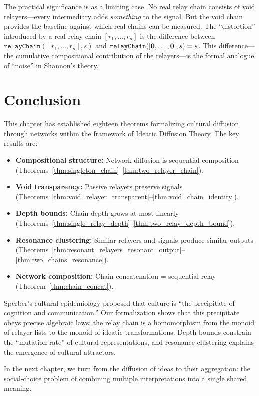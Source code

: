 The practical significance is as a limiting case.  No real relay chain
consists of void relayers---every intermediary adds \emph{something} to
the signal.  But the void chain provides the baseline against which
real chains can be measured.  The ``distortion'' introduced by a real
relay chain $[r_1, \ldots, r_n]$ is the difference between
$\texttt{relayChain}([r_1, \ldots, r_n], s)$ and
$\texttt{relayChain}([\mathbf{0}, \ldots, \mathbf{0}], s) = s$.  This
difference---the cumulative compositional contribution of the
relayers---is the formal analogue of ``noise'' in Shannon's theory.

\section{Conclusion}
\label{sec:ch18-concl}

This chapter has established eighteen theorems formalizing cultural
diffusion through networks within the framework of Ideatic Diffusion Theory.
The key results are:

\begin{itemize}
  \item \textbf{Compositional structure:} Network diffusion is sequential
    composition (Theorems~\ref{thm:singleton_chain}--\ref{thm:two_relayer_chain}).
  \item \textbf{Void transparency:} Passive relayers preserve signals
    (Theorems~\ref{thm:void_relayer_transparent}--\ref{thm:void_chain_identity}).
  \item \textbf{Depth bounds:} Chain depth grows at most linearly
    (Theorems~\ref{thm:single_relay_depth}--\ref{thm:two_relay_depth_bound}).
  \item \textbf{Resonance clustering:} Similar relayers and signals produce
    similar outputs (Theorems~\ref{thm:resonant_relayers_resonant_output}--\ref{thm:two_chains_resonance}).
  \item \textbf{Network composition:} Chain concatenation = sequential relay
    (Theorem~\ref{thm:chain_concat}).
\end{itemize}

Sperber's cultural epidemiology proposed that culture is ``the precipitate
of cognition and communication.''  Our formalization shows that this
precipitate obeys precise algebraic laws: the relay chain is a homomorphism
from the monoid of relayer lists to the monoid of ideatic transformations.
Depth bounds constrain the ``mutation rate'' of cultural representations,
and resonance clustering explains the emergence of cultural attractors.

In the next chapter, we turn from the diffusion of ideas to their
aggregation: the social-choice problem of combining multiple interpretations
into a single shared meaning.
